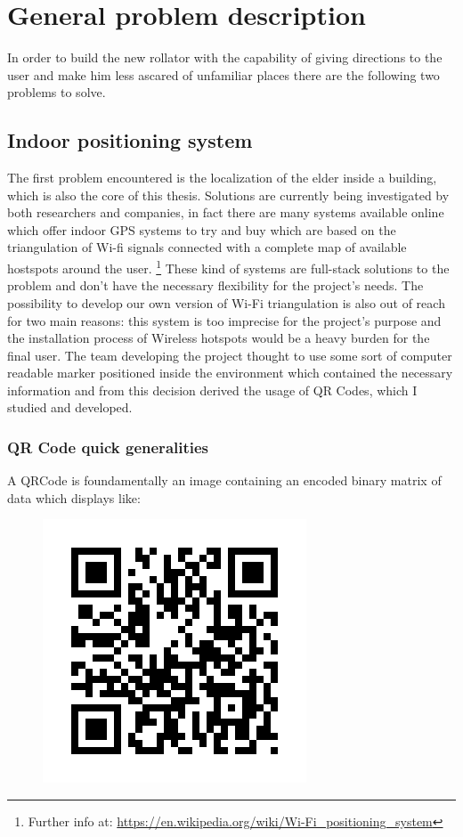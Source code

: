 \chapter{General problem description}

\vspace{6cm}
In order to build the new rollator with the capability of giving directions to
the user and make him less ascared of unfamiliar places there are the following
two problems to solve.
\newpage

\section{Indoor positioning system}
The first problem encountered is the localization of the elder inside a
building, which is also the core of this thesis.
Solutions are currently being investigated by both researchers and companies, in fact there are many systems available online which offer indoor 
GPS systems to try and buy which are based on the triangulation of Wi-fi signals connected with a
complete map of available hostspots around the user.
\footnote{Further info at: 
\url{https://en.wikipedia.org/wiki/Wi-Fi_positioning_system}}
These kind of systems are full-stack solutions to the problem and don't have the
necessary flexibility for the project's needs.
The possibility to develop our own version of Wi-Fi triangulation is also out of reach for two main reasons:
this system is too imprecise for the project's purpose and the installation process of Wireless hotspots would be a heavy burden for the final user.
\newline
The team developing the project thought to use some sort of computer readable 
marker positioned inside the environment which contained the necessary information
and from this decision derived the usage of QR Codes, which I studied and
developed.

\subsection{QR Code quick generalities}
A QRCode is foundamentally an image containing an encoded binary matrix of data which displays like:
\begin{figure}[hbt]
    \centering
    \includegraphics[scale=0.5]{img/qr.png}
\end{figure}

